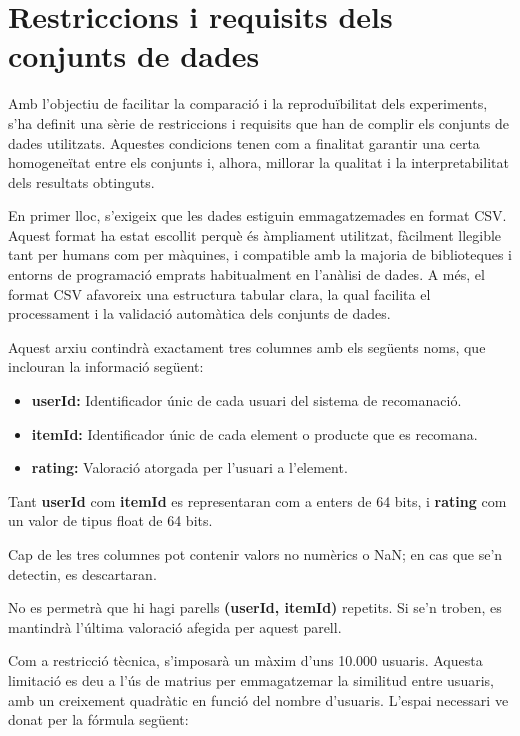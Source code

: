 \documentclass[a4paper,12pt]{report}
\begin{document}
\section{Restriccions i requisits dels conjunts de dades}

Amb l’objectiu de facilitar la comparació i la reproduïbilitat dels experiments, s’ha definit una sèrie de restriccions i requisits que han de complir els conjunts de dades utilitzats. Aquestes condicions tenen com a finalitat garantir una certa homogeneïtat entre els conjunts i, alhora, millorar la qualitat i la interpretabilitat dels resultats obtinguts.

En primer lloc, s’exigeix que les dades estiguin emmagatzemades en format CSV. Aquest format ha estat escollit perquè és àmpliament utilitzat, fàcilment llegible tant per humans com per màquines, i compatible amb la majoria de biblioteques i entorns de programació emprats habitualment en l’anàlisi de dades. A més, el format CSV afavoreix una estructura tabular clara, la qual facilita el processament i la validació automàtica dels conjunts de dades.

Aquest arxiu contindrà exactament tres columnes amb els següents noms, que inclouran la informació següent:
\begin{itemize}
    \item \textbf{userId:} Identificador únic de cada usuari del sistema de recomanació.
    \item \textbf{itemId:} Identificador únic de cada element o producte que es recomana.
\item \textbf{rating:} Valoració atorgada per l'usuari a l'element.
\end{itemize}

Tant \textbf{userId} com \textbf{itemId} es representaran com a enters de 64 bits, i \textbf{rating} com un valor de tipus float de 64 bits.

Cap de les tres columnes pot contenir valors no numèrics o NaN; en cas que se'n detectin, es descartaran.

No es permetrà que hi hagi parells \textbf{(userId, itemId)} repetits. Si se'n troben, es mantindrà l’última valoració afegida per aquest parell.

Com a restricció tècnica, s’imposarà un màxim d’uns 10.000 usuaris.
Aquesta limitació es deu a l’ús de matrius per emmagatzemar la similitud entre usuaris, amb un creixement quadràtic en funció del nombre d’usuaris.
L’espai necessari ve donat per la fórmula següent:
\end{document}
